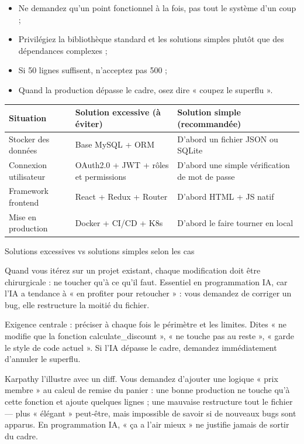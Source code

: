 \begin{itemize}
  \item Ne demandez qu'un point fonctionnel à la fois, pas tout le système d'un coup ;
  \item Privilégiez la bibliothèque standard et les solutions simples plutôt que des dépendances complexes ;
  \item Si 50 lignes suffisent, n'acceptez pas 500 ;
  \item Quand la production dépasse le cadre, osez dire « coupez le superflu ».
\end{itemize}

\begin{center}
\begin{tabularx}{\linewidth}{|X|X|X|}
\hline
\textbf{Situation} & \textbf{Solution excessive (à éviter)} & \textbf{Solution simple (recommandée)} \tabularnewline
\hline
Stocker des données & Base MySQL + ORM & D'abord un fichier JSON ou SQLite \tabularnewline
Connexion utilisateur & OAuth2.0 + JWT + rôles et permissions & D'abord une simple vérification de mot de passe \tabularnewline
Framework frontend & React + Redux + Router & D'abord HTML + JS natif \tabularnewline
Mise en production & Docker + CI/CD + K8s & D'abord le faire tourner en local \tabularnewline
\hline
\end{tabularx}
\end{center}

\begin{center}\small\color{gray}Solutions excessives vs solutions simples selon les cas\end{center}


Quand vous itérez sur un projet existant, chaque modification doit être chirurgicale : ne toucher qu'à ce qu'il faut. Essentiel en programmation IA, car l'IA a tendance à « en profiter pour retoucher » : vous demandez de corriger un bug, elle restructure la moitié du fichier.

Exigence centrale : préciser à chaque fois le périmètre et les limites. Dites « ne modifie que la fonction calculate\_discount », « ne touche pas au reste », « garde le style de code actuel ». Si l'IA dépasse le cadre, demandez immédiatement d'annuler le superflu.

Karpathy l'illustre avec un diff. Vous demandez d'ajouter une logique « prix membre » au calcul de remise du panier : une bonne production ne touche qu'à cette fonction et ajoute quelques lignes ; une mauvaise restructure tout le fichier — plus « élégant » peut-être, mais impossible de savoir si de nouveaux bugs sont apparus. En programmation IA, « ça a l'air mieux » ne justifie jamais de sortir du cadre.

